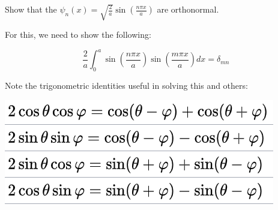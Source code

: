 \documentclass{article}
\begin{document}
\hfill

Show that the $\psi_n(x) = \sqrt{\frac{2}{a}} \sin \left( \frac{n \pi x}{a} \right)$ are orthonormal. 

For this, we need to show the following:

$$\frac{2}{a} \int_0^a \sin \left( \frac{n \pi x}{a} \right) \sin \left( \frac{m \pi x}{a} \right) dx = \delta_{mn}$$

Note the trigonometric identities useful in solving this and others:

\includegraphics[width = 0.4 \textwidth]{Lecture05/5.png}
\end{document}
